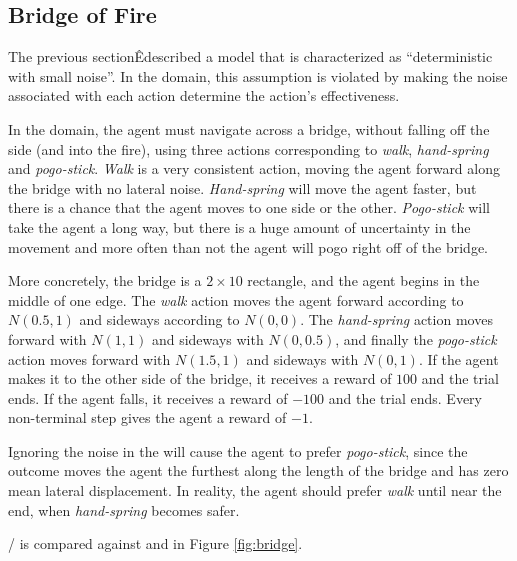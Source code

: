 \subsection{Bridge of Fire}
\label{fire}

The previous sectionÊdescribed a model that is characterized as ``deterministic with small noise''. In the  domain, this assumption is violated by making the noise associated with each action determine the action's effectiveness.

In the  domain, the agent must navigate across a bridge, without falling off the side (and into the fire), using three actions corresponding to \emph{walk}, \emph{hand-spring} and \emph{pogo-stick}. \emph{Walk} is a very consistent action, moving the agent forward along the bridge with no lateral noise. \emph{Hand-spring} will move the agent faster, but there is a chance that the agent moves to one side or the other. \emph{Pogo-stick} will take the agent a long way, but there is a huge amount of uncertainty in the movement and more often than not the agent will pogo right off of the bridge.

More concretely, the bridge is a $2\times 10$ rectangle, and the agent begins in the middle of one edge. The \emph{walk} action moves the agent forward according to $N(0.5, 1)$ and sideways according to $N(0, 0)$. The \emph{hand-spring} action moves forward with $N(1,1)$ and sideways with $N(0,0.5)$, and finally the \emph{pogo-stick} action moves forward with $N(1.5,1)$ and sideways with $N(0,1)$. If the agent makes it to the other side of the bridge, it receives a reward of $100$ and the trial ends. If the agent falls, it receives a reward of $-100$ and the trial ends. Every non-terminal step gives the agent a reward of $-1$.


Ignoring the noise in the  will cause the agent to prefer \emph{pogo-stick}, since the outcome moves the agent the furthest along the length of the bridge and has zero mean lateral displacement. In reality, the agent should prefer \emph{walk} until near the end, when \emph{hand-spring} becomes safer.

/ is compared against  and  in Figure \ref{fig:bridge}.


